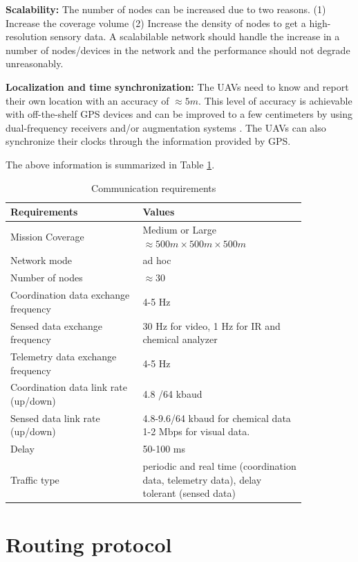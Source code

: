 \textbf{Scalability:} The number of nodes can be increased due to two reasons. (1) Increase the coverage volume (2) Increase the density of nodes to get a high-resolution sensory data. A scalabilable network  should handle the increase in a number of nodes/devices in the network and the performance should not degrade unreasonably. 

\textbf{Localization and time synchronization:} The UAVs need to know and report their own location with an accuracy of $\approx 5 m$. This level of accuracy is achievable with off-the-shelf GPS devices and can be improved to a few centimeters by using dual-frequency receivers and/or augmentation systems \cite{gps_accuracy} . The UAVs can also synchronize their clocks through the information provided by GPS.

The above information is summarized in Table \ref{tab:communication_requirements}.
\begin{table}
\caption{Communication requirements}
\label{tab:communication_requirements}
\begin{tabular}{|p{0.38\linewidth}|p{0.47\linewidth}|}
\toprule
Requirements & Values\\
\midrule
Mission Coverage & Medium or Large $\approx 500 m \times 500 m \times 500 m$ \\
\midrule
Network mode & ad hoc \\
\midrule
Number of nodes &  $\approx 30 $ \\
\midrule
Coordination data exchange frequency &  4-5 Hz \cite{7463007}\\
\midrule
Sensed data exchange frequency & 30 Hz for video, 1 Hz for IR and chemical analyzer \cite{7463007}\\
\midrule
Telemetry data exchange frequency & 4-5 Hz \cite{7463007}\\
\midrule
Coordination data link rate (up/down) & 4.8 /64 kbaud \cite{7463007} \\
\midrule
Sensed data link rate (up/down) & 4.8-9.6/64 kbaud for chemical data \cite{NASA_UAV_mission_parameters} 1-2 Mbps for visual data.\\
\midrule
Delay & 50-100 ms \cite{7463007}\\
\midrule
Traffic type & periodic and real time (coordination data, telemetry data), delay tolerant (sensed data) \\
\bottomrule
\end{tabular}
\end{table}

\section{Routing protocol} 
\label{routing_protocol}

